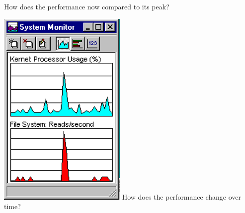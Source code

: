 \documentclass[pdf]{beamer}
\begin{document}
\begin{frame}
\begin{minipage}[t]{0.9\linewidth}
\begin{minipage}[t]{0.25\linewidth}
\begin{flushleft}
    \newline
    \newline
    \scriptsize How does the performance now compared to its peak? 
\end{flushleft}
\end{minipage}
\hfill
\begin{minipage}[t]{0.25\linewidth}
\begin{flushleft}
	\includegraphics[scale=0.5]{9_Picture3.png}
    \newline
    \newline
    \scriptsize How does the performance change over time?
\end{flushleft}
\end{minipage}
\end{minipage}
\end{frame}



\end{document}
